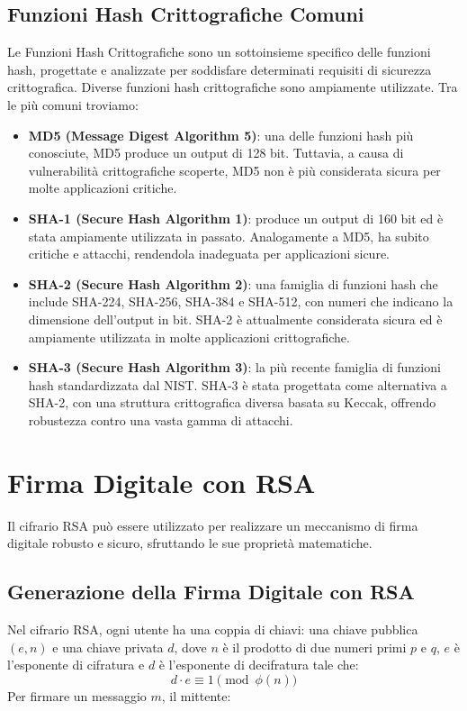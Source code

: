 \documentclass[a4paper,12pt]{report}
\begin{document}
\subsection*{Funzioni Hash Crittografiche Comuni}
Le Funzioni Hash Crittografiche sono un sottoinsieme specifico delle funzioni hash, progettate e analizzate per soddisfare determinati requisiti di sicurezza crittografica. 
Diverse funzioni hash crittografiche sono ampiamente utilizzate. Tra le più comuni troviamo:
\begin{itemize}
    \item \textbf{MD5 (Message Digest Algorithm 5)}: una delle funzioni hash più conosciute, MD5 produce un output di 128 bit. Tuttavia, a causa di vulnerabilità crittografiche scoperte, MD5 non è più considerata sicura per molte applicazioni critiche.
    \item \textbf{SHA-1 (Secure Hash Algorithm 1)}: produce un output di 160 bit ed è stata ampiamente utilizzata in passato. Analogamente a MD5, ha subito critiche e attacchi, rendendola inadeguata per applicazioni sicure.
    \item \textbf{SHA-2 (Secure Hash Algorithm 2)}: una famiglia di funzioni hash che include SHA-224, SHA-256, SHA-384 e SHA-512, con numeri che indicano la dimensione dell'output in bit. SHA-2 è attualmente considerata sicura ed è ampiamente utilizzata in molte applicazioni crittografiche.
    \item \textbf{SHA-3 (Secure Hash Algorithm 3)}: la più recente famiglia di funzioni hash standardizzata dal NIST. SHA-3 è stata progettata come alternativa a SHA-2, con una struttura crittografica diversa basata su Keccak, offrendo robustezza contro una vasta gamma di attacchi.
\end{itemize}

\section{Firma Digitale con RSA}
Il cifrario RSA può essere utilizzato per realizzare un meccanismo di firma digitale robusto e sicuro, sfruttando le sue proprietà matematiche.

\subsection{Generazione della Firma Digitale con RSA}
Nel cifrario RSA, ogni utente ha una coppia di chiavi: una chiave pubblica $(e, n)$ e una chiave privata $d$, dove $n$ è il prodotto di due numeri primi $p$ e $q$, $e$ è l'esponente di cifratura e $d$ è l'esponente di decifratura tale che:
\[d \cdot e \equiv 1 \pmod{\phi(n)}\]
Per firmare un messaggio $m$, il mittente:
\end{document}
